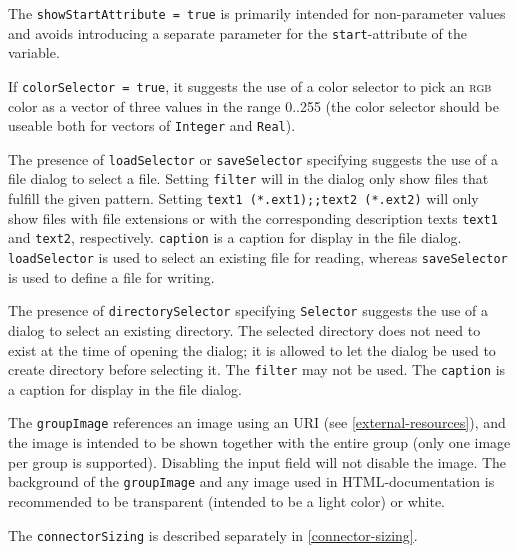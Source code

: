 \begin{annotationdefinition}[Dialog]
\begin{semantics}
\begin{nonnormative}
The \lstinline!showStartAttribute = true! is primarily intended for non-parameter values and avoids introducing a separate parameter for the \lstinline!start!-attribute of the variable.
\end{nonnormative}

If \lstinline!colorSelector = true!, it suggests the use of a color selector to pick an \textsc{rgb} color as a vector of three values in the range 0..255 (the color selector should be useable both for vectors of \lstinline!Integer! and \lstinline!Real!).

The presence of \lstinline!loadSelector! or \lstinline!saveSelector! specifying  suggests the use of a file dialog to select a file.
Setting \lstinline!filter! will in the dialog only show files that fulfill the given pattern.
Setting \lstinline!text1 (*.ext1);;text2 (*.ext2)! will only show files with file extensions  or  with the corresponding description texts \lstinline!text1! and \lstinline!text2!, respectively.
\lstinline!caption! is a caption for display in the file dialog.
\lstinline!loadSelector! is used to select an existing file for reading, whereas \lstinline!saveSelector! is used to define a file for writing.

The presence of \lstinline!directorySelector! specifying \lstinline!Selector! suggests the use of a dialog to select an existing directory.
The selected directory does not need to exist at the time of opening the dialog; it is allowed to let the dialog be used to create directory before selecting it.
The \lstinline!filter! may not be used.
The \lstinline!caption! is a caption for display in the file dialog.

The \lstinline!groupImage! references an image using an URI (see \cref{external-resources}), and the image is intended to be shown together with the entire group (only one image per group is supported).
Disabling the input field will not disable the image.
The background of the \lstinline!groupImage! and any image used in HTML-documentation is recommended to be transparent (intended to be a light color) or white.

The \lstinline!connectorSizing! is described separately in \cref{connector-sizing}.


\end{semantics}
\end{annotationdefinition}

